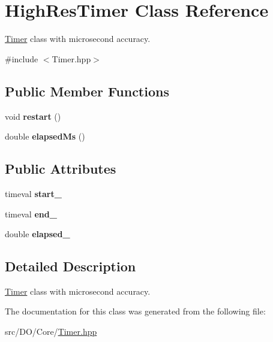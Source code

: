 \hypertarget{class_d_o_1_1_high_res_timer}{\section{High\-Res\-Timer Class Reference}
\label{class_d_o_1_1_high_res_timer}
}


\hyperlink{class_d_o_1_1_timer}{Timer} class with microsecond accuracy.  




{\ttfamily \#include $<$Timer.\-hpp$>$}

\subsection*{Public Member Functions}
\begin{DoxyCompactItemize}
\item 
\hypertarget{class_d_o_1_1_high_res_timer_a22ee094ca3f45aa4156b97d34fe678bf}{void {\bfseries restart} ()}\label{class_d_o_1_1_high_res_timer_a22ee094ca3f45aa4156b97d34fe678bf}

\item 
\hypertarget{class_d_o_1_1_high_res_timer_af4dbcc0b93d74e5fb7100c4299f9ec20}{double {\bfseries elapsed\-Ms} ()}\label{class_d_o_1_1_high_res_timer_af4dbcc0b93d74e5fb7100c4299f9ec20}

\end{DoxyCompactItemize}
\subsection*{Public Attributes}
\begin{DoxyCompactItemize}
\item 
\hypertarget{class_d_o_1_1_high_res_timer_a2ea9282fd2003b9e952e0d2bb54e48c7}{timeval {\bfseries start\-\_\-}}\label{class_d_o_1_1_high_res_timer_a2ea9282fd2003b9e952e0d2bb54e48c7}

\item 
\hypertarget{class_d_o_1_1_high_res_timer_a1ce1b9ff5082e17ac8a6679b7b8df5a4}{timeval {\bfseries end\-\_\-}}\label{class_d_o_1_1_high_res_timer_a1ce1b9ff5082e17ac8a6679b7b8df5a4}

\item 
\hypertarget{class_d_o_1_1_high_res_timer_ac0935164e30e3396a46e9494efb83fe7}{double {\bfseries elapsed\-\_\-}}\label{class_d_o_1_1_high_res_timer_ac0935164e30e3396a46e9494efb83fe7}

\end{DoxyCompactItemize}


\subsection{Detailed Description}
\hyperlink{class_d_o_1_1_timer}{Timer} class with microsecond accuracy. 

The documentation for this class was generated from the following file\-:\begin{DoxyCompactItemize}
\item 
src/\-D\-O/\-Core/\hyperlink{_timer_8hpp}{Timer.\-hpp}\end{DoxyCompactItemize}
